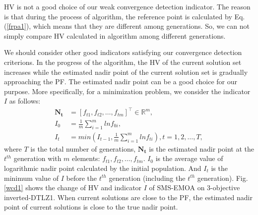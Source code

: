 \documentclass[conference]{IEEEtran}
\begin{document}
HV is not a good choice of our weak convergence detection indicator. 
The reason is that during the process of algorithm, the reference point is calculated by Eq. (\ref{frpa1}), 
which means that they are different among generations. 
So, we can not simply compare HV calculated in algorithm among different generations. 

We should consider other good indicators satisfying our convergence detection criterions. 
In the progress of the algorithm, the HV of the current solution set increases 
while the estimated nadir point of the current solution set is gradually approaching the PF. 
The estimated nadir point can be a good choice for our purpose. 
More specifically,
for a minimization problem, we consider the indicator $I$ as follows:
\begin{equation}\begin{aligned}\label{ewcd1}
  \boldsymbol{N_{t}} &= [f_{t1},f_{t2},\dots,f_{tm}]^\top \in \mathbb{R}^m ,\\
  I_{0} &= \frac{1}{m} \sum_{i=1}^{m}lnf_{0i},\\
  I_{t} &= min(I_{t-1},\frac{1}{m} \sum_{i=1}^{m}lnf_{ti}),
  t = 1,2,\dots,T,
\end{aligned}
\end{equation}
where $T$ is the total number of generations, 
$\boldsymbol{N_{t}}$ is the estimated nadir point at the $t^{th}$ generation with $m$ elements: $f_{t1},f_{t2},\dots,f_{tm}$. 
$I_0$ is the average value of logarithmic nadir point calculated by the initial population.
And $I_t$ is the minimum value of $I$ before the $t^{th}$ generation (including the $t^{th}$ generation). 
Fig. \ref{wcd1} shows the change of HV and indicator $I$ of SMS-EMOA on 3-objective inverted-DTLZ1.
When current solutions are close to the PF, the estimated nadir point of current solutions is close 
to the true nadir point. 
\end{document}

